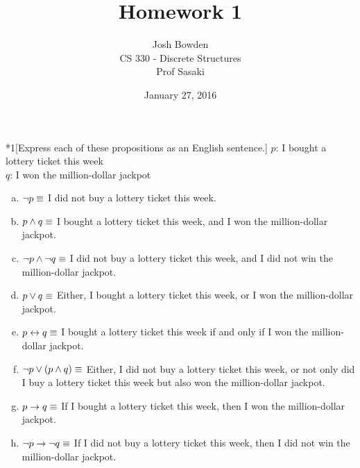 \documentclass{homework}
\begin{document}
\title{Homework 1}
\author{Josh Bowden\vspace*{8pt}\\
CS 330 - Discrete Structures\\
Prof Sasaki}

\date{January 27, 2016}

\maketitle

\begin{problem}*{1}[Express each of these propositions as an English sentence.]
$p$: I bought a lottery ticket this week \\
$q$: I won the million-dollar jackpot

\begin{enumerate}[(a)]
\item $\neg p \\ \equiv$ I did not buy a lottery ticket this week.

\item $p \land q \\ \equiv$ I bought a lottery ticket this week, and I won the million-dollar jackpot.

\item $\neg p \land \neg q \\ \equiv$ I did not buy a lottery ticket this week, and I did not win the million-dollar jackpot.

\item $p \lor q \\ \equiv$ Either, I bought a lottery ticket this week, or I won the million-dollar jackpot.

\item $p \leftrightarrow q \\ \equiv$ I bought a lottery ticket this week if and only if I won the million-dollar jackpot.

\item $\neg p \lor (p \land q) \\ \equiv$ Either, I did not buy a lottery ticket this week, or not only did I buy a lottery ticket this week but also won the million-dollar jackpot.

\item $p \rightarrow q \\ \equiv$ If I bought a lottery ticket this week, then I won the million-dollar jackpot.

\item $\neg p \rightarrow \neg q \\ \equiv$ If I did not buy a lottery ticket this week, then I did not win the million-dollar jackpot.

\end{enumerate}
\end{problem}
\end{document}
